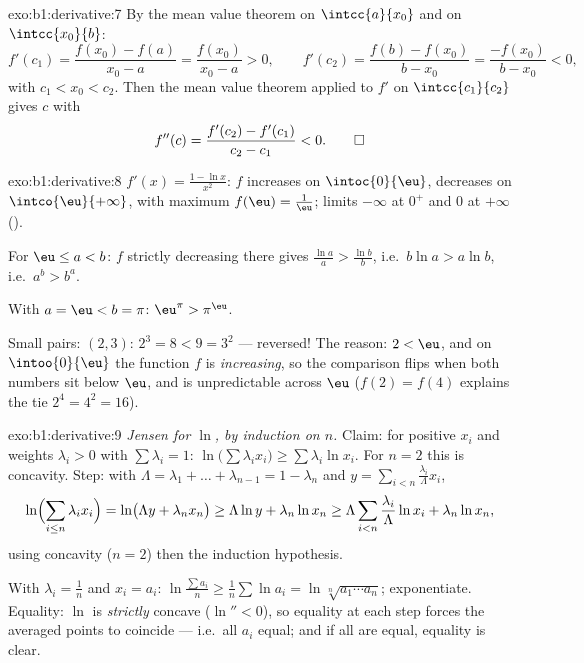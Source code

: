 \begin{solution}{exo:b1:derivative:7}
By the mean value theorem on $\intcc{a}{x_0}$ and on
$\intcc{x_0}{b}$:
\[
f'(c_1) = \frac{f(x_0) - f(a)}{x_0 - a} = \frac{f(x_0)}{x_0 - a} > 0,
\qquad
f'(c_2) = \frac{f(b) - f(x_0)}{b - x_0} = \frac{-f(x_0)}{b - x_0} < 0,
\]
with $c_1 < x_0 < c_2$. Then the mean value theorem applied to $f'$
on $\intcc{c_1}{c_2}$ gives $c$ with
\[
f''(c) = \frac{f'(c_2) - f'(c_1)}{c_2 - c_1} < 0 . \qedhere
\]
\end{solution}

\begin{solution}{exo:b1:derivative:8}
$f'(x) = \frac{1 - \ln x}{x^2}$: $f$ increases on $\intoc{0}{\eu}$,
decreases on $\intco{\eu}{+\infty}$, with maximum $f(\eu) =
\frac1\eu$; limits $-\infty$ at $0^+$ and $0$ at $+\infty$ ().

For $\eu \leq a < b$: $f$ strictly decreasing there gives
$\frac{\ln a}{a} > \frac{\ln b}{b}$, i.e.\ $b \ln a > a \ln b$,
i.e.\ $a^b > b^a$.

With $a = \eu < b = \pi$: $\eu^\pi > \pi^\eu$.

Small pairs: $(2, 3)$: $2^3 = 8 < 9 = 3^2$ --- reversed! The reason:
$2 < \eu$, and on $\intoo{0}{\eu}$ the function $f$ is
\emph{increasing}, so the comparison flips when both numbers sit
below $\eu$, and is unpredictable across $\eu$ ($f(2) = f(4)$
explains the tie $2^4 = 4^2 = 16$).
\end{solution}

\begin{solution}{exo:b1:derivative:9}
\emph{Jensen for $\ln$, by induction on $n$.} Claim: for positive
$x_i$ and weights $\lambda_i > 0$ with $\sum \lambda_i = 1$:
$\ln\bigl(\sum \lambda_i x_i\bigr) \geq \sum \lambda_i \ln x_i$. For
$n = 2$ this is concavity. Step: with $\Lambda = \lambda_1 + \dots +
\lambda_{n-1} = 1 - \lambda_n$ and $y = \sum_{i<n}
\frac{\lambda_i}{\Lambda} x_i$,
\[
\ln\Bigl(\sum_{i \leq n} \lambda_i x_i\Bigr)
= \ln\bigl(\Lambda y + \lambda_n x_n\bigr)
\geq \Lambda \ln y + \lambda_n \ln x_n
\geq \Lambda \sum_{i<n} \frac{\lambda_i}{\Lambda}\ln x_i
+ \lambda_n \ln x_n,
\]
using concavity ($n = 2$) then the induction hypothesis.

With $\lambda_i = \frac 1n$ and $x_i = a_i$: $\ln\frac{\sum a_i}{n}
\geq \frac 1n \sum \ln a_i = \ln\sqrt[n]{a_1\cdots a_n}$;
exponentiate. Equality: $\ln$ is \emph{strictly} concave ($\ln'' < 0$),
so equality at each step forces the averaged points to coincide ---
i.e.\ all $a_i$ equal; and if all are equal, equality is clear.
\end{solution}

